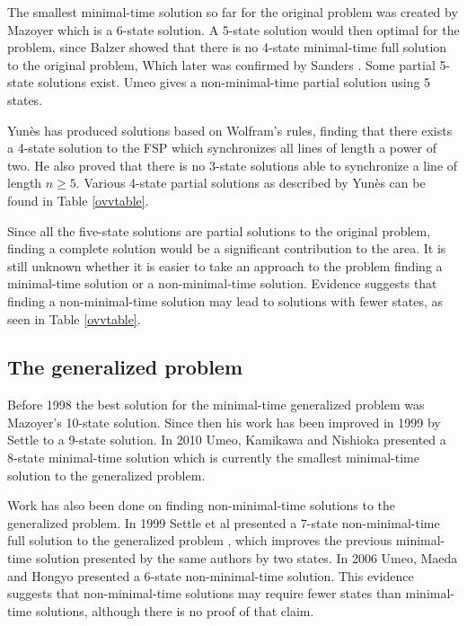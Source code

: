 \documentclass{article}
\begin{document}
The smallest minimal-time solution so far for the original problem was created by Mazoyer which is a 6-state solution\cite{Mazoyer1987}. A 5-state solution would then optimal for the problem, since Balzer  showed that there is no 4-state minimal-time full solution to the original problem\cite{Balzer1967}, Which later was confirmed by Sanders \cite{Sanders1994}. Some partial 5-state solutions exist. Umeo gives a non-minimal-time partial solution using 5 states\cite{umeo2007smallest}.

Yun\`{e}s has produced solutions based on Wolfram's rules, finding that there exists a 4-state solution to the FSP which synchronizes all lines of length a power of two\cite{yunes20084}. He also proved that there is no 3-state solutions able to synchronize a line of length $n \ge 5$. Various 4-state partial solutions as described by Yun\`{e}s can be found in Table \ref{ovvtable}.

Since all the five-state solutions are partial solutions to the original problem, finding a complete solution would be a significant contribution to the area. It is still unknown whether it is easier to take an approach to the problem finding a minimal-time solution or a non-minimal-time solution. Evidence suggests that finding a non-minimal-time solution may lead to solutions with fewer states, as seen in Table \ref{ovvtable}.

\subsection{The generalized problem}
Before 1998 the best solution for the minimal-time generalized problem was Mazoyer's 10-state solution\cite{Mazoyer1987}. Since then his work has been improved in 1999 by Settle to a 9-state solution\cite{settle1999new}. In 2010 Umeo, Kamikawa and Nishioka \cite{umeo2010generalized} presented a 8-state minimal-time solution which is currently the smallest minimal-time solution to the generalized problem.

Work has also been done on finding non-minimal-time solutions to the generalized problem. In 1999 Settle et al presented a 7-state non-minimal-time full solution to the generalized problem \cite{settle1999new}, which improves the previous minimal-time solution presented by the same authors by two states. In 2006 Umeo, Maeda and Hongyo presented a 6-state non-minimal-time solution\cite{umeo2006design}. This evidence suggests that non-minimal-time solutions may require fewer states than minimal-time solutions, although there is no proof of that claim.
\end{document}
